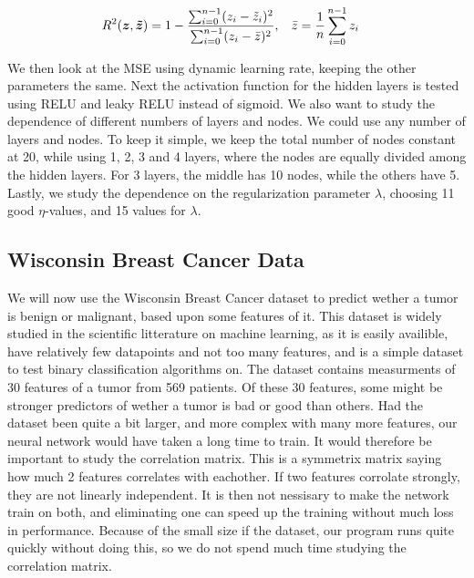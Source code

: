 \documentclass[12pt]{extarticle}
\begin{document}
\begin{align} \label{eq:R2_score}
	R^2(\boldsymbol{z}, \boldsymbol{\tilde{z}}) & = 1 - \frac{\sum_{i=0}^{n-1}(z_i - \tilde{z}_i)^2}{\sum_{i=0}^{n-1}(z_i - \bar{z})^2}, \hspace{3mm} \bar{z} = \frac{1}{n}\sum_{i=0}^{n-1}z_i
\end{align}


We then look at the MSE using dynamic learning rate, keeping the other parameters the same. Next the activation function for the hidden layers is tested using RELU and leaky RELU  instead of sigmoid. We also want to study the dependence of different numbers of layers and nodes. We could use any number of layers and nodes. To keep it simple, we keep the total number of nodes constant at 20, while using 1, 2, 3 and 4 layers, where the nodes are equally divided among the hidden layers. For 3 layers, the middle has 10 nodes, while the others have 5. Lastly, we study the dependence on the regularization parameter $\lambda$, choosing 11 good $\eta$-values, and 15 values for $\lambda$.

\subsection{Wisconsin Breast Cancer Data}
We will now use the Wisconsin Breast Cancer dataset to predict wether a tumor is benign or malignant, based upon some features of it. This dataset is widely studied in the scientific litterature on machine learning, as it is easily availible, have relatively few datapoints and not too many features, and is a simple dataset to test binary classification algorithms on. The dataset contains measurments of 30 features of a tumor from 569 patients. Of these 30 features, some might be stronger predictors of wether a tumor is bad or good than others. Had the dataset been quite a bit larger, and more complex with many more features, our neural network would have taken a long time to train. It would therefore be important to study the correlation matrix. This is a symmetrix matrix saying how much 2 features correlates with eachother. If two features corrolate strongly, they are not linearly independent. It is then not nessisary to make the network train on both, and eliminating one can speed up the training without much loss in performance. Because of the small size if the dataset, our program runs quite quickly without doing this, so we do not spend much time studying the correlation matrix.
\end{document}
